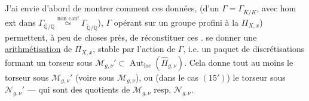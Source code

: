 J'ai envie d'abord de montrer comment ces données,
 (d'un
$\Gamma=\Gamma_{\overline K/K}$, avec hom ext dans
$\Gamma_{\overline{\mathbb Q}/\mathbb Q}\overset{\text{non can!}}\simeq
\Gamma_{\widetilde{\mathbb Q}/\mathbb Q}$),
$\Gamma$ opérant sur un groupe profini à la $\Pi_{X,x}$) permettent, à peu de
choses près, de réconstituer ces .
 se donner une
\uline{arithmétisation} de $\Pi_{X,x}$,
stable par l'action de $\Gamma$, i.e. un paquet de discrétisations
 formant un torseur sous
$\mathcal M_{g,\nu}'\subset\operatorname{Aut}_{\mathrm{loc}}(\widehat\Pi_{g,\nu})$.
Cela donne tout au moins le torseur sous $\mathcal M_{g,\nu}'$
(voire sous $\mathcal M_{g,\nu}$), ou (dans le cas $(15')$) le torseur sous
$\mathcal N_{g,\nu}'$ --- qui sont des quotients de $\mathcal M_{g,\nu}$
resp. $\mathcal N_{g,\nu}$.
